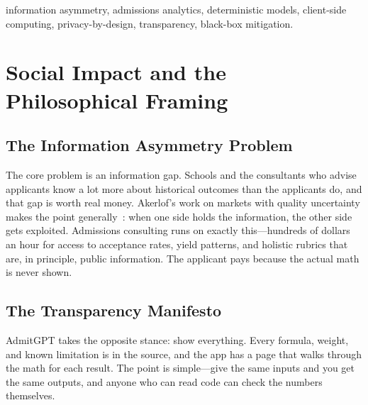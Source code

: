 \documentclass[conference]{IEEEtran}
\begin{document}
\begin{IEEEkeywords}
information asymmetry, admissions analytics, deterministic models, client-side computing, privacy-by-design, transparency, black-box mitigation.
\end{IEEEkeywords}

\section{Social Impact and the Philosophical Framing}
\subsection{The Information Asymmetry Problem}
The core problem is an information gap. Schools and the consultants who advise applicants know a lot more about historical outcomes than the applicants do, and that gap is worth real money. Akerlof's work on markets with quality uncertainty makes the point generally~\cite{akerlof}: when one side holds the information, the other side gets exploited. Admissions consulting runs on exactly this---hundreds of dollars an hour for access to acceptance rates, yield patterns, and holistic rubrics that are, in principle, public information. The applicant pays because the actual math is never shown.

\subsection{The Transparency Manifesto}
AdmitGPT takes the opposite stance: show everything. Every formula, weight, and known limitation is in the source, and the app has a page that walks through the math for each result. The point is simple---give the same inputs and you get the same outputs, and anyone who can read code can check the numbers themselves.
\end{document}
